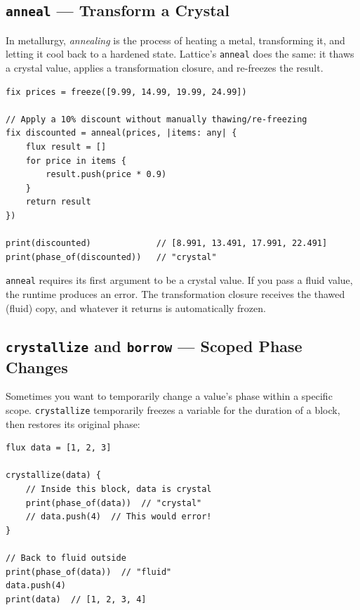 
\subsection{\texttt{anneal} --- Transform a Crystal}\label{subsec:anneal}


In metallurgy, \emph{annealing} is the process of heating a metal, transforming it, and letting it cool back to a hardened state.
Lattice's \lstinline|anneal| does the same: it thaws a crystal value, applies a transformation closure, and re-freezes the result.

\begin{lstlisting}[language=Lattice, caption={Annealing a crystal value}]
fix prices = freeze([9.99, 14.99, 19.99, 24.99])

// Apply a 10% discount without manually thawing/re-freezing
fix discounted = anneal(prices, |items: any| {
    flux result = []
    for price in items {
        result.push(price * 0.9)
    }
    return result
})

print(discounted)             // [8.991, 13.491, 17.991, 22.491]
print(phase_of(discounted))   // "crystal"
\end{lstlisting}

\lstinline|anneal| requires its first argument to be a crystal value.
If you pass a fluid value, the runtime produces an error.
The transformation closure receives the thawed (fluid) copy, and whatever it returns is automatically frozen.


\subsection{\texttt{crystallize} and \texttt{borrow} --- Scoped Phase Changes}\label{subsec:crystallize-borrow}


Sometimes you want to temporarily change a value's phase within a specific scope.
\lstinline|crystallize| temporarily freezes a variable for the duration of a block, then restores its original phase:

\begin{lstlisting}[language=Lattice, caption={Temporary crystallization}]
flux data = [1, 2, 3]

crystallize(data) {
    // Inside this block, data is crystal
    print(phase_of(data))  // "crystal"
    // data.push(4)  // This would error!
}

// Back to fluid outside
print(phase_of(data))  // "fluid"
data.push(4)
print(data)  // [1, 2, 3, 4]
\end{lstlisting}


